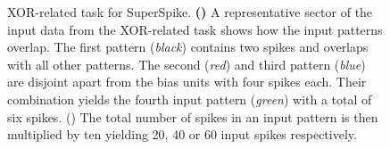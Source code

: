 \begin{figure}	
	\begin{subfigure}{0.5\textwidth}
		\caption{}
		
		\label{superspiketaskpicturesector}
	\end{subfigure}
	\begin{subfigure}{0.5\textwidth}
		\caption{}
		
		\label{superspiketaskpicture}
	\end{subfigure}
	\caption[XOR-related task for SuperSpike.]{XOR-related task for SuperSpike. \textbf{()} A representative sector of the input data from the XOR-related task shows how the input patterns overlap. The first pattern (\textit{black}) contains two spikes and overlaps with all other patterns. The second (\textit{red}) and third pattern (\textit{blue}) are disjoint apart from the bias units with four spikes each. Their combination yields the fourth input pattern (\textit{green}) with a total of six spikes. () The total number of spikes in an input pattern is then multiplied by ten yielding 20, 40 or 60 input spikes respectively.
	\label{superspiketaskoverview}}
\end{figure} 

